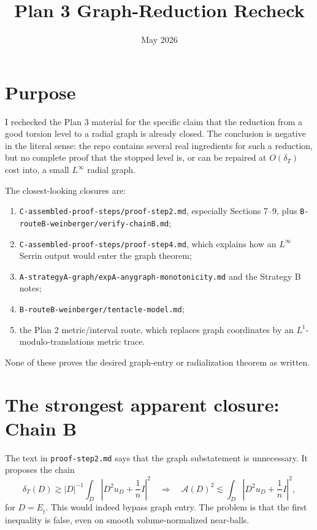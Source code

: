 \documentclass[11pt]{article}
\title{Plan 3 Graph-Reduction Recheck}
\author{}
\date{May 2026}
\newcommand{\dT}{\delta_T}
\newcommand{\A}{\mathcal A}
\newcommand{\Et}{E_{\widehat t}}
\begin{document}
\maketitle

\section{Purpose}

I rechecked the Plan 3 material for the specific claim that the reduction from
a good torsion level to a radial graph is already closed.  The conclusion is
negative in the literal sense: the repo contains several real ingredients for
such a reduction, but no complete proof that the stopped level is, or can be
repaired at \(O(\dT)\) cost into, a small \(L^\infty\) radial graph.

The closest-looking closures are:
\begin{enumerate}[label=\arabic*.]
\item \texttt{C-assembled-proof-steps/proof-step2.md}, especially Sections
7--9, plus \texttt{B-routeB-weinberger/verify-chainB.md};
\item \texttt{C-assembled-proof-steps/proof-step4.md}, which explains how an
\(L^\infty\) Serrin output would enter the graph theorem;
\item \texttt{A-strategyA-graph/expA-anygraph-monotonicity.md} and the
Strategy B notes;
\item \texttt{B-routeB-weinberger/tentacle-model.md};
\item the Plan 2 metric/interval route, which replaces graph coordinates by
an \(L^1\)-modulo-translations metric trace.
\end{enumerate}

None of these proves the desired graph-entry or radialization theorem as
written.

\section{The strongest apparent closure: Chain B}

The text in \texttt{proof-step2.md} says that the graph substatement is
unnecessary.  It proposes the chain
\[
   \dT(D)
      \gtrsim |D|^{-1}
      \int_D \left|D^2u_D+\frac1nI\right|^2
      \quad\Longrightarrow\quad
   \A(D)^2
      \lesssim
      \int_D \left|D^2u_D+\frac1nI\right|^2,
\]
for \(D=\Et\).  This would indeed bypass graph entry.  The problem is that
the first inequality is false, even on smooth volume-normalized near-balls.
\end{document}

